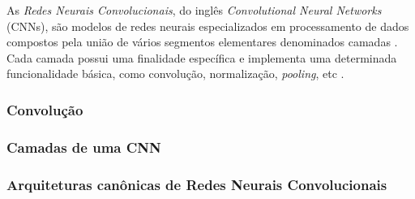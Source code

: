 As \textit{Redes Neurais Convolucionais}, do inglês \textit{Convolutional Neural Networks} (CNNs), são modelos de redes neurais especializados em processamento de dados compostos pela união de vários segmentos elementares denominados camadas \cite{ref:goodfellow}. Cada camada possui uma finalidade específica e implementa uma determinada funcionalidade básica, como convolução, normalização, \textit{pooling}, etc \cite{ref:khan}.

\subsubsection{Convolução} \label{subsubsec:convolucao}


\subsubsection{Camadas de uma CNN} \label{subsubsec:camadas}


\subsubsection{Arquiteturas canônicas de Redes Neurais Convolucionais} \label{subsubsec:arquiteturas}

